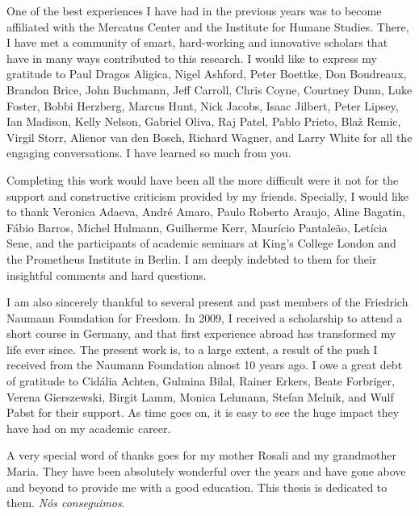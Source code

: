 \documentclass[a4paper,12pt]{report}
\begin{document}
One of the best experiences I have had in the previous years was to become affiliated with the Mercatus Center and the Institute for Humane Studies. There, I have met a community of smart, hard-working and innovative scholars that have in many ways contributed to this research. I would like to express my gratitude to Paul Dragos Aligica, Nigel Ashford, Peter Boettke, Don Boudreaux, Brandon Brice, John Buchmann, Jeff Carroll, Chris Coyne, Courtney Dunn, Luke Foster, Bobbi Herzberg, Marcus Hunt, Nick Jacobs, Isaac Jilbert, Peter Lipsey, Ian Madison, Kelly Nelson, Gabriel Oliva, Raj Patel, Pablo Prieto, Blaž Remic, Virgil Storr, Alienor van den Bosch, Richard Wagner, and Larry White for all the engaging conversations. I have learned so much from you.

Completing this work would have been all the more difficult were it not for the support and constructive criticism provided by my friends. Specially, I would like to thank Veronica Adaeva, André Amaro, Paulo Roberto Araujo, Aline Bagatin, Fábio Barros, Michel Hulmann, Guilherme Kerr, Maurício Pantaleão, Letícia Sene, and the participants of academic seminars at King's College London and the Prometheus Institute in Berlin. I am deeply indebted to them for their insightful comments and hard questions.

I am also sincerely thankful to several present and past members of the Friedrich Naumann Foundation for Freedom. In 2009, I received a scholarship to attend a short course in Germany, and that first experience abroad has transformed my life ever since. The present work is, to a large extent, a result of the push I received from the Naumann Foundation almost 10 years ago. I owe a great debt of gratitude to Cidália Achten, Gulmina Bilal, Rainer Erkers, Beate Forbriger, Verena Gierszewski, Birgit Lamm, Monica Lehmann, Stefan Melnik, and Wulf Pabst for their support. As time goes on, it is easy to see the huge impact they have had on my academic career.

A very special word of thanks goes for my mother Rosali and my grandmother Maria. They have been absolutely wonderful over the years and have gone above and beyond to provide me with a good education. This thesis is dedicated to them. \textit{Nós conseguimos}. 


\newpage
{\hypersetup{linkcolor=black}
\tableofcontents
\listoftables
{}
{}
\listoffigures
{}
{}
}
\end{document}
